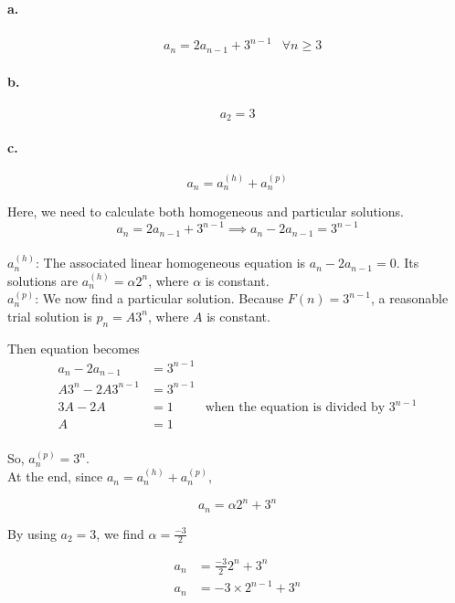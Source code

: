 \documentclass[11pt]{article}
\begin{document}
\paragraph{\textbf{a.}}
\begin{align*}
    &a_n = 2 a_{n-1} + 3^{n-1} &\forall n \geq 3
\end{align*}

\paragraph{\textbf{b.}}
\begin{equation*}
    a_2 = 3
\end{equation*}

\paragraph{\textbf{c.}}
\begin{equation*}
    a_n = a_n^{(h)} + a_n^{(p)}
\end{equation*}

Here, we need to calculate both homogeneous and particular solutions.
\begin{equation*}
    a_n = 2 a_{n-1} + 3^{n-1} \implies a_n - 2 a_{n-1} = 3^{n-1}
\end{equation*}
\\

$a_n^{(h)}$: The associated linear homogeneous equation is  $a_n - 2 a_{n-1} = 0$. Its solutions are $a_n^{(h)} = \alpha 2^n$, where $\alpha$ is constant.\\

$a_n^{(p)}$: We now ﬁnd a particular solution. Because $F(n) = 3^{n-1}$, a reasonable trial solution is $p_n = A3^n$, where $A$ is constant.

Then equation becomes
\begin{align*}
    a_n - 2 a_{n-1} &= 3^{n-1}\\
    A3^n - 2A3^{n-1} &= 3^{n-1}\\
    3A - 2A &= 1 &\text{when the equation is divided by $3^{n-1}$}\\
    A &= 1\\
\end{align*}

So, $a_n^{(p)} = 3^n$.\\

At the end, since $a_n = a_n^{(h)} + a_n^{(p)}$,

\begin{equation*}
    a_n = \alpha 2^n + 3^n
\end{equation*}

By using $a_2 = 3$, we find $\alpha = \frac{-3}{2}$

\begin{align*}
    a_n &= \frac{-3}{2} 2^n + 3^n\\
    a_n &= -3 \times 2^{n-1} + 3^n
\end{align*}
\end{document}
